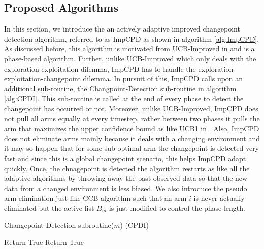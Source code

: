 \subsection{Proposed Algorithms}

In this section, we introduce the an actively adaptive improved changepoint detection algorithm, referred to as ImpCPD as shown in algorithm \ref{alg:ImpCPD}. As discussed before, this algorithm is motivated from UCB-Improved in \citet{auer2010ucb} and is a phase-based algorithm. Further, unlike UCB-Improved which only deals with the exploration-exploitation dilemma, ImpCPD has to handle the exploration-exploitation-changepoint dilemma. In pursuit of this, ImpCPD calls upon an additional sub-routine, the Changpoint-Detection sub-routine in algorithm \ref{alg:CPDI}. This sub-routine is called at the end of every phase to detect the changepoint has occurred or not. Moreover, unlike UCB-Improved, ImpCPD does not pull all arms equally at every timestep, rather between two phases it pulls the arm that maximizes the upper confidence bound as like UCB1 in \citet{auer2002finite}. Also, ImpCPD does not eliminate arms mainly because it deals with a changing environment and it may so happen that for some sub-optimal arm the changepoint is detected very fast and since this is a global changepoint scenario, this helps ImpCPD adapt quickly. Once, the chnagepoint is detected the algorithm restarts as like all the adaptive algorithms by throwing away the past observed data so that the new data from a changed environment is less biased. We also introduce the pseudo arm elimination just like CCB \citep{liu2016modification} algorithm  such that an arm $i$ is never actually eliminated but the active list $B_m$ is just modified to control the phase length.

\begin{algorithm}[!ht]
\caption{Changepoint-Detection-subroutine($m$) (CPDI)}
\label{alg:CPDI}
\begin{algorithmic}
\State {}
\State Return True
\State Return True
\EndIf
\EndFor
\EndFor
\end{algorithmic}
\end{algorithm}



